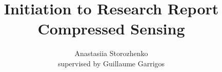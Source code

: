 \documentclass[12pt]{article}
\title{Initiation to Research Report \\ Compressed Sensing}
\author{Anastasiia Storozhenko \\ supervised by Guillaume Garrigos}
\theoremstyle{definition}
\theoremstyle{remark}
\theoremstyle{remark}
\numberwithin{equation}{section}
\begin{document}
    \maketitle

%










%

    \nocite{*}
\printbibliography
\end{document}
